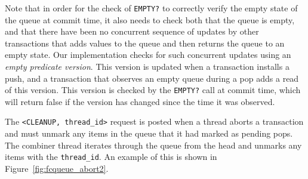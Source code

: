 Note that in order for the check of \texttt{EMPTY?} to correctly verify the empty state of the queue at commit time, it also needs to check both that the queue is empty, and that there have been no concurrent sequence of updates by other transactions that adds values to the queue and then returns the queue to an empty state. Our implementation checks for such concurrent updates using an \emph{empty predicate version}. This version is updated when a transaction installs a push, and a transaction that observes an empty queue during a pop adds a read of this version. This version is checked by the \texttt{EMPTY?} call at commit time, which will return false if the version has changed since the time it was observed.

The \texttt{<CLEANUP, thread\_id>} request is posted when a thread aborts a transaction and must unmark any items in the queue that it had marked as pending pops. The combiner thread iterates through the queue from the head and unmarks any items with the \texttt{thread\_id}. An example of this is shown in Figure~\ref{fig:fcqueue_abort2}.


